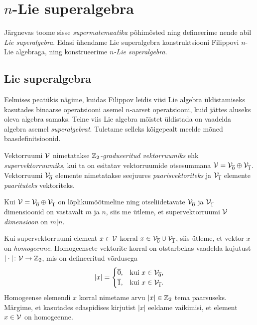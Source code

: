 

\section{\texorpdfstring{$n$}{n}-Lie superalgebra}

Järgnevas toome sisse \emph{supermatemaatika} põhimõsted ning defineerime
nende abil \emph{Lie superalgebra}. Edasi ühendame Lie superalgebra
konstruktsiooni Filippovi $n$-Lie algebraga, ning konstrueerime
\emph{$n$-Lie superalgebra}.

\subsection{Lie superalgebra}

Eelmises peatükis nägime, kuidas Filippov leidis viisi Lie algebra
üldistamiseks kasutades binaarse operatsiooni asemel $n$-aarset
operatsiooni, kuid jättes aluseks oleva algebra samaks. Teine viis
Lie algebra mõistet üldistada on vaadelda algebra asemel \emph{superalgebrat}.
Tuletame selleks kõigepealt meelde mõned baasdefinitsioonid.

\begin{dfn}
    Vektorruumi $\mathcal{V}$ nimetatakse \emph{$\mathbb{Z}_2$-gradueeritud vektorruumiks}
    ehk \emph{supervektorruumiks}, kui ta on esitatav vektorruumide
    otsesummana $\mathcal{V} = \mathcal{V}_{\overline{0}} \oplus \mathcal{V}_{\overline{1}}$.
    Vektorruumi $\mathcal{V}_{\overline{0}}$ elemente nimetatakse seejuures
    \emph{paarisvektoriteks} ja $\mathcal{V}_{\overline{1}}$ elemente
    \emph{paarituteks} vektoriteks.
\end{dfn}

Kui $\mathcal{V} = \mathcal{V}_{\overline{0}} \oplus \mathcal{V}_{\overline{1}}$ on
lõplikumõõtmeline ning otseliidetavate $\mathcal{V}_{\overline{0}}$ ja
$\mathcal{V}_{\overline{1}}$ dimensioonid on vastavalt $m$ ja $n$, siis
me ütleme, et supervektorruumi $\mathcal{V}$ \emph{dimensioon} on $m|n$.

Kui supervektorruumi element $x \in \mathcal{V}$ korral
$x \in \mathcal{V}_{\overline{0}} \cup \mathcal{V}_{\overline{1}}$, siis ütleme, et
vektor $x$ on \emph{homogeenne}. Homogeensete vektorite korral on
otstarbekas vaadelda kujutust $|\cdot| \colon \mathcal{V} \to \mathbb{Z}_2$, mis on defineeritud
võrdusega
\begin{align*}
    |x| = \begin{cases}
        \overline{0}, &\text{kui}\ x \in \mathcal{V}_{\overline{0}}, \\
        \overline{1}, &\text{kui}\ x \in \mathcal{V}_{\overline{1}}.
    \end{cases}
\end{align*}
Homogeense elemendi $x$ korral nimetame arvu $|x| \in \mathbb{Z}_2$ tema
paarsuseks. Märgime, et kasutades edaspidises kirjutist $|x|$ eeldame
vaikimisi, et element $x \in \mathcal{V}$ on homogeenne.

